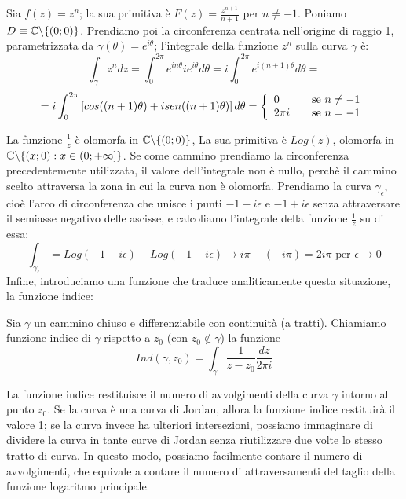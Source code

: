 Sia $f(z)=z^n$; la sua primitiva è $F(z)=\frac{z^{n+1}}{n+1}$ per $n \neq -1$. Poniamo $D\equiv \mathbb{C} \backslash \{(0;0)\}$. Prendiamo poi la circonferenza centrata nell'origine di raggio 1, parametrizzata da $\gamma(\theta)=e^{i \theta}$; l'integrale della funzione $z^n$ sulla curva $\gamma$ è:
$$\int_{\gamma} z^n dz=\int_0 ^{2\pi} e^{i n \theta} i e^{i \theta} d\theta=i \int_0 ^{2\pi} e^{i (n+1) \theta} d\theta=$$
$$=i \int_0 ^{2\pi} \left[cos((n+1)\theta)+isen((n+1)\theta)\right] d\theta= \left\{
  \begin{array}{l l}
    0 & \quad \text{se $n \neq -1$}\\
    2 \pi i & \quad \text{se $n=-1$}
  \end{array} \right.$$

La funzione $\frac{1}{z}$ è olomorfa in $\mathbb{C} \backslash \{(0;0)\}$, La sua primitiva è $Log(z)$, olomorfa in $\mathbb{C} \backslash \{(x;0) : x \in (0;+\infty]\}$. Se come cammino prendiamo la circonferenza precedentemente utilizzata, il valore dell'integrale non è nullo, perchè il cammino scelto attraversa la zona in cui la curva non è olomorfa. Prendiamo la curva $\gamma_{\epsilon}$, cioè l'arco di circonferenza che unisce i punti $-1-i\epsilon$ e $-1+i\epsilon$ senza attraversare il semiasse negativo delle ascisse, e calcoliamo l'integrale della funzione $\frac{1}{z}$ su di essa:
$$\int_{\gamma_{\epsilon}}=Log(-1+i\epsilon)-Log(-1-i\epsilon) \to i\pi -(-i\pi)=2i\pi \text{ per } \epsilon \to 0$$
Infine, introduciamo una funzione che traduce analiticamente questa situazione, la funzione indice:
\begin{definizione}
Sia $\gamma$ un cammino chiuso e differenziabile con continuità (a tratti). Chiamiamo funzione indice di $\gamma$ rispetto a $z_0$ (con $z_0 \notin \gamma$) la funzione 
$$Ind(\gamma,z_0)=\int_{\gamma} \frac{1}{z-z_0} \frac{dz}{2 \pi i}$$
\end{definizione}

La funzione indice restituisce il numero di avvolgimenti della curva $\gamma$ intorno al punto $z_0$. Se la curva è una curva di Jordan,  allora la funzione indice restituirà il valore 1; se la curva invece ha ulteriori intersezioni, possiamo immaginare di dividere la curva in tante curve di Jordan senza riutilizzare due volte lo stesso tratto di curva. In questo modo, possiamo facilmente contare il numero di avvolgimenti, che equivale a contare il numero di attraversamenti del taglio della funzione logaritmo principale.

